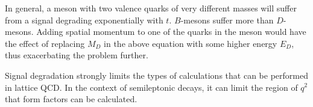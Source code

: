 In general, a meson with two valence quarks of very different masses will suffer from a signal degrading exponentially with $t$. $B$-mesons suffer more than $D$-mesons. Adding spatial momentum to one of the quarks in the meson would have the effect of replacing $M_D$ in the above equation with some higher energy $E_D$, thus exacerbating the problem further.

Signal degradation strongly limits the types of calculations that can be performed in lattice QCD. In the context of semileptonic decays, it can limit the region of $q^2$ that form factors can be calculated.




